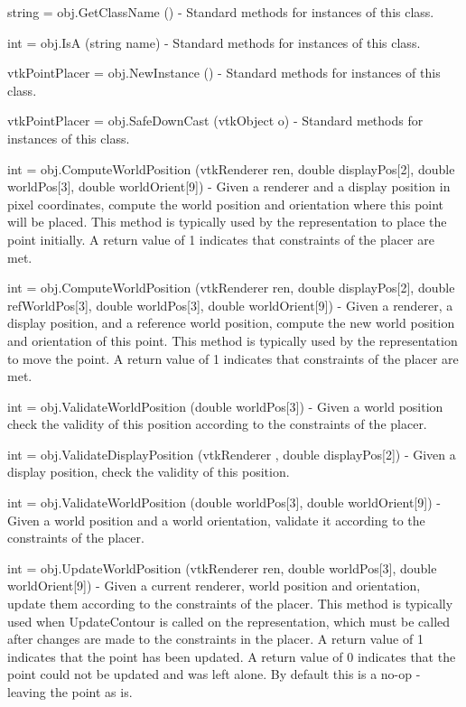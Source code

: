 \begin{DoxyItemize}
\item {\ttfamily string = obj.\-Get\-Class\-Name ()} -\/ Standard methods for instances of this class.  
\item {\ttfamily int = obj.\-Is\-A (string name)} -\/ Standard methods for instances of this class.  
\item {\ttfamily vtk\-Point\-Placer = obj.\-New\-Instance ()} -\/ Standard methods for instances of this class.  
\item {\ttfamily vtk\-Point\-Placer = obj.\-Safe\-Down\-Cast (vtk\-Object o)} -\/ Standard methods for instances of this class.  
\item {\ttfamily int = obj.\-Compute\-World\-Position (vtk\-Renderer ren, double display\-Pos\mbox{[}2\mbox{]}, double world\-Pos\mbox{[}3\mbox{]}, double world\-Orient\mbox{[}9\mbox{]})} -\/ Given a renderer and a display position in pixel coordinates, compute the world position and orientation where this point will be placed. This method is typically used by the representation to place the point initially. A return value of 1 indicates that constraints of the placer are met.  
\item {\ttfamily int = obj.\-Compute\-World\-Position (vtk\-Renderer ren, double display\-Pos\mbox{[}2\mbox{]}, double ref\-World\-Pos\mbox{[}3\mbox{]}, double world\-Pos\mbox{[}3\mbox{]}, double world\-Orient\mbox{[}9\mbox{]})} -\/ Given a renderer, a display position, and a reference world position, compute the new world position and orientation of this point. This method is typically used by the representation to move the point. A return value of 1 indicates that constraints of the placer are met.  
\item {\ttfamily int = obj.\-Validate\-World\-Position (double world\-Pos\mbox{[}3\mbox{]})} -\/ Given a world position check the validity of this position according to the constraints of the placer.  
\item {\ttfamily int = obj.\-Validate\-Display\-Position (vtk\-Renderer , double display\-Pos\mbox{[}2\mbox{]})} -\/ Given a display position, check the validity of this position.  
\item {\ttfamily int = obj.\-Validate\-World\-Position (double world\-Pos\mbox{[}3\mbox{]}, double world\-Orient\mbox{[}9\mbox{]})} -\/ Given a world position and a world orientation, validate it according to the constraints of the placer.  
\item {\ttfamily int = obj.\-Update\-World\-Position (vtk\-Renderer ren, double world\-Pos\mbox{[}3\mbox{]}, double world\-Orient\mbox{[}9\mbox{]})} -\/ Given a current renderer, world position and orientation, update them according to the constraints of the placer. This method is typically used when Update\-Contour is called on the representation, which must be called after changes are made to the constraints in the placer. A return value of 1 indicates that the point has been updated. A return value of 0 indicates that the point could not be updated and was left alone. By default this is a no-\/op -\/ leaving the point as is.  

\end{DoxyItemize}
